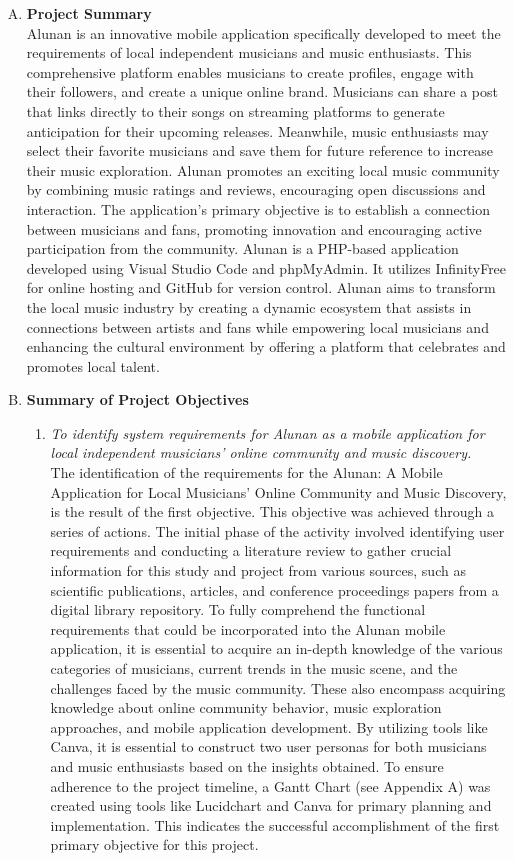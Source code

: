 \begin{enumerate}[A.]
    \item \textbf{Project Summary} \\
    Alunan is an innovative mobile application specifically developed to meet the requirements of local independent musicians and music enthusiasts. This comprehensive platform enables musicians to create profiles, engage with their followers, and create a unique online brand. Musicians can share a post that links directly to their songs on streaming platforms to generate anticipation for their upcoming releases. Meanwhile, music enthusiasts may select their favorite musicians and save them for future reference to increase their music exploration. Alunan promotes an exciting local music community by combining music ratings and reviews, encouraging open discussions and interaction. The application's primary objective is to establish a connection between musicians and fans, promoting innovation and encouraging active participation from the community. Alunan is a PHP-based application developed using Visual Studio Code and phpMyAdmin. It utilizes InfinityFree for online hosting and GitHub for version control. Alunan aims to transform the local music industry by creating a dynamic ecosystem that assists in connections between artists and fans while empowering local musicians and enhancing the cultural environment by offering a platform that celebrates and promotes local talent.

    \item \textbf{Summary of Project Objectives}
    \begin{enumerate}[1.]
        \item \textit{To identify system requirements for Alunan as a mobile application for local independent musicians’ online community and music discovery.} \\
        The identification of the requirements for the Alunan: A Mobile Application for Local Musicians’ Online Community and Music Discovery, is the result of the first objective. This objective was achieved through a series of actions. The initial phase of the activity involved identifying user requirements and conducting a literature review to gather crucial information for this study and project from various sources, such as scientific publications, articles, and conference proceedings papers from a digital library repository. To fully comprehend the functional requirements that could be incorporated into the Alunan mobile application, it is essential to acquire an in-depth knowledge of the various categories of musicians, current trends in the music scene, and the challenges faced by the music community. These also encompass acquiring knowledge about online community behavior, music exploration approaches, and mobile application development. By utilizing tools like Canva, it is essential to construct two user personas for both musicians and music enthusiasts based on the insights obtained. To ensure adherence to the project timeline, a Gantt Chart (see Appendix A) was created using tools like Lucidchart and Canva for primary planning and implementation. This indicates the successful accomplishment of the first primary objective for this project.


\end{enumerate}
\end{enumerate}

